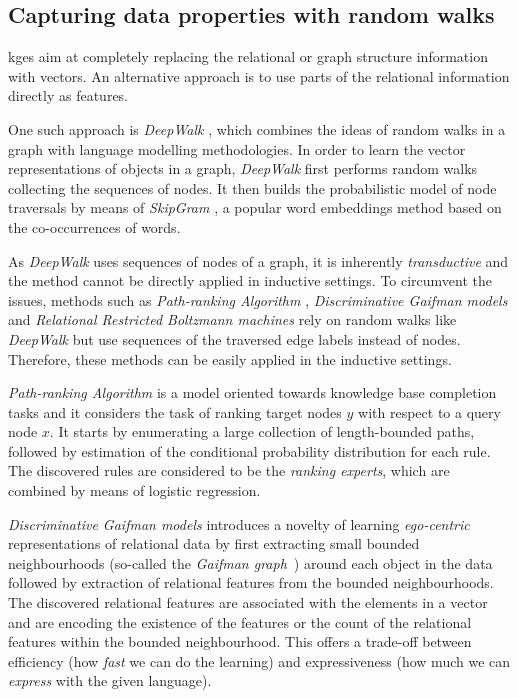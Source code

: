 





\subsection{Capturing data properties with random walks}


\gls{kge}s aim at completely replacing the relational or graph structure information with vectors.
An alternative approach is to use parts of the relational information directly as features.


One such approach is \textit{DeepWalk} \cite{Perozzi:2014:DOL:2623330.2623732}, which combines the ideas of random walks in a graph with language modelling methodologies.
In order to learn the vector representations of objects in a graph, \textit{DeepWalk} first performs random walks collecting the sequences of nodes.
It then builds the probabilistic model of node traversals by means of \textit{SkipGram} \cite{NIPS2013_Skipgram}, a popular word embeddings method based on the co-occurrences of words.



As \textit{DeepWalk} uses sequences of nodes of a graph, it is inherently \textit{transductive} and the method cannot be directly applied in inductive settings.
To circumvent the issues, methods such as \textit{Path-ranking Algorithm} \cite{lao2010pra,Lao:2011:RWI:2145432.2145494}, \textit{Discriminative Gaifman models} \cite{Niepert:2016:DGM:3157382.3157479} and \textit{Relational Restricted Boltzmann machines} \cite{KaurILP17} rely on random walks like \textit{DeepWalk} but use sequences of the traversed edge labels instead of nodes.
Therefore, these methods can be easily applied in the inductive settings.



\textit{Path-ranking Algorithm} is a model oriented towards knowledge base completion tasks and it considers the task of ranking target nodes $y$ with respect to a query node $x$.
It starts by enumerating a large collection of length-bounded paths, followed by estimation of the conditional probability distribution for each rule.
The discovered rules are considered to be the \textit{ranking experts}, which are combined by means of logistic regression.




\textit{Discriminative Gaifman models} introduces a novelty of learning \textit{ego-centric} representations of relational data by first extracting small bounded neighbourhoods (so-called the \textit{Gaifman graph}~\cite{GAIFMAN1982105}) around each object in the data followed by extraction of relational features from the bounded neighbourhoods.
The discovered relational features are associated with the elements in a vector and are encoding the existence of the features or the count of the relational features within the bounded neighbourhood.
This offers a trade-off between efficiency (how \textit{fast} we can do the learning) and expressiveness (how much we can \textit{express} with the given language).



